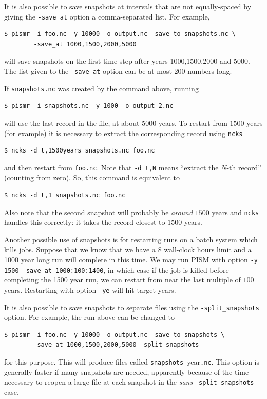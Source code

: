 \documentclass[11pt,final]{amsart}
\newcommand{\pismoptionindex}[1]{\index{options for PISM (and PETSc)!\texttt{-#1}}}
\newcommand{\intextoption}[1]{\texttt{-#1}\pismoptionindex{#1}}
\begin{document}
It is also possible to save snapshots at intervals that are not equally-spaced
by giving the \verb|-save_at| option a comma-separated list. For example,
\begin{verbatim}
$ pismr -i foo.nc -y 10000 -o output.nc -save_to snapshots.nc \
        -save_at 1000,1500,2000,5000
\end{verbatim}
will save snapshots on the first time-step after years 1000,1500,2000 and 5000.
The list given to the \verb|-save_at| option can be at most 200 numbers long.

If \verb|snapshots.nc| was created by the command above, running
\begin{verbatim}
$ pismr -i snapshots.nc -y 1000 -o output_2.nc
\end{verbatim}
will use the last record in the file, at about $5000$ years. To restart from $1500$ years (for example) it is necessary to extract the corresponding record using \verb|ncks|
\begin{verbatim}
$ ncks -d t,1500years snapshots.nc foo.nc
\end{verbatim}
and then restart from \verb|foo.nc|. Note that \verb|-d t,N| means ``extract the $N$-th record'' (counting from zero). So, this command is equivalent to
\begin{verbatim}
$ ncks -d t,1 snapshots.nc foo.nc
\end{verbatim}
Also note that the second snapshot will probably be \emph{around} $1500$ years and \verb|ncks| handles this correctly: it takes the record closest to $1500$ years.

Another possible use of snapshots is for restarting runs on a batch system which kills jobs.  Suppose that we know that we have a 8 wall-clock hours limit and a 1000 year long run will complete in this time.  We may run PISM with option \verb|-y 1500 -save_at 1000:100:1400|, in which case if the job is killed before completing the 1500 year run, we can restart from near the last multiple of $100$ years.  Restarting with option \intextoption{ye} will hit target years.

It is also possible to save snapshots to separate files using the
\verb|-split_snapshots| option.  For example, the run above can be changed to
\begin{verbatim}
$ pismr -i foo.nc -y 10000 -o output.nc -save_to snapshots \
        -save_at 1000,1500,2000,5000 -split_snapshots
\end{verbatim}
for this purpose.  This will produce files called \verb|snapshots-|year\verb|.nc|.  This option is generally faster if many snapshots are needed, apparently because of the time necessary to reopen a large file at each snapshot in the \emph{sans} \verb|-split_snapshots| case.
\end{document}
